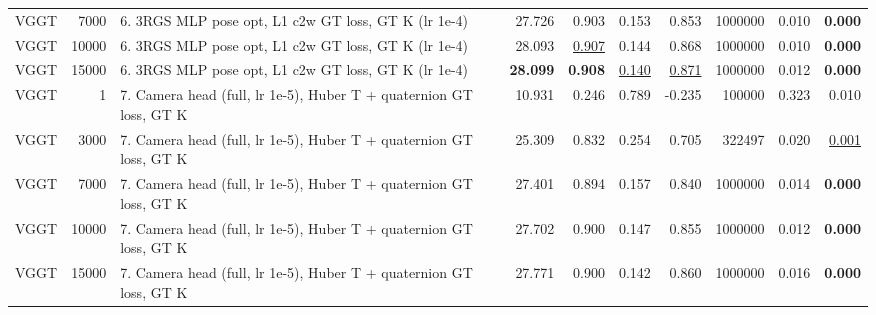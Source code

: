 \begin{table}[H]
\begin{tabular}{lrlrrrrrrr}
VGGT & 7000 & 6. 3RGS MLP pose opt, L1 c2w GT loss, GT K (lr 1e-4) & 27.726 & 0.903 & 0.153 & 0.853 & 1000000 & 0.010 & \textbf{0.000} \\
VGGT & 10000 & 6. 3RGS MLP pose opt, L1 c2w GT loss, GT K (lr 1e-4) & 28.093 & \underline{0.907} & 0.144 & 0.868 & 1000000 & 0.010 & \textbf{0.000} \\
VGGT & 15000 & 6. 3RGS MLP pose opt, L1 c2w GT loss, GT K (lr 1e-4) & \textbf{28.099} & \textbf{0.908} & \underline{0.140} & \underline{0.871} & 1000000 & 0.012 & \textbf{0.000} \\
VGGT & 1 & 7. Camera head (full, lr 1e-5), Huber T + quaternion GT loss, GT K & 10.931 & 0.246 & 0.789 & -0.235 & 100000 & 0.323 & 0.010 \\
VGGT & 3000 & 7. Camera head (full, lr 1e-5), Huber T + quaternion GT loss, GT K & 25.309 & 0.832 & 0.254 & 0.705 & 322497 & 0.020 & \underline{0.001} \\
VGGT & 7000 & 7. Camera head (full, lr 1e-5), Huber T + quaternion GT loss, GT K & 27.401 & 0.894 & 0.157 & 0.840 & 1000000 & 0.014 & \textbf{0.000} \\
VGGT & 10000 & 7. Camera head (full, lr 1e-5), Huber T + quaternion GT loss, GT K & 27.702 & 0.900 & 0.147 & 0.855 & 1000000 & 0.012 & \textbf{0.000} \\
VGGT & 15000 & 7. Camera head (full, lr 1e-5), Huber T + quaternion GT loss, GT K & 27.771 & 0.900 & 0.142 & 0.860 & 1000000 & 0.016 & \textbf{0.000} \\
\bottomrule
\end{tabular}
\end{table}